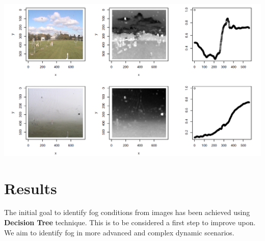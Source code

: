 \documentclass{article}
\begin{document}
\begin{minipage}[b]{\columnwidth}
	\begin{center}
	\includegraphics[width=0.95\columnwidth]{transmission}
	\label{figTransmission}
	\end{center}
\end{minipage}
\vspace*{-5cm}


\section*{Results}
The initial goal to identify fog conditions from images has been achieved using \textbf{Decision Tree} technique. This is to be considered a first step to improve upon. We aim to identify fog in more advanced and complex dynamic scenarios.
\end{document}
